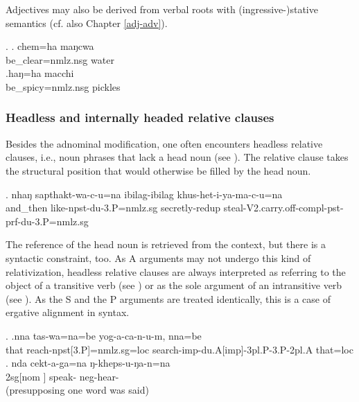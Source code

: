 Adjectives may also be derived from verbal roots with (ingressive-)stative semantics \Next (cf. also Chapter \ref{adj-adv}).


	  \ex. \ag.  chem=ha maŋcwa\\
	be\_clear{\sc =nmlz.nsg}  water		\\
	\bg.haŋ=ha macchi\\
	be\_spicy{\sc =nmlz.nsg}	pickles	\\

	
 

\subsubsection{Headless and internally headed relative clauses}\label{internally-headed-rc}
	
Besides the adnominal modification, one often encounters headless relative clauses, i.e.,  noun phrases that lack a head noun (see \Next). The relative clause takes the structural position that would otherwise be filled by the head noun.

\exg.  nhaŋ   sapthakt-wa-c-u=na                ibilag-ibilag       khus-het-i-ya-ma-c-u=na\\
 and\_then like{\sc -npst-du-3.P=nmlz.sg} secretly-{\sc redup} steal{\sc -V2.carry.off-compl-pst-prf-du-3.P=nmlz.sg}\\
 


The reference of the head noun is retrieved from the context, but there is a syntactic constraint, too.
As A arguments may not undergo this kind of relativization, headless relative clauses are always interpreted as referring to the object of a transitive verb (see \Next[a]) or as the sole argument of an intransitive verb (see \Next[b]). As the S and the P arguments are treated identically, this is a case of ergative alignment in syntax.

\ex. \ag.nna  tas-wa=na=be  yog-a-ca-n-u-m, nna=be\\
	that reach{\sc [3sg.A]-npst[3.P]=nmlz.sg=loc} search{\sc -imp-du.A[imp]-3pl.P-3.P-2pl.A}	that{\sc =loc}	\\
	\bg. nda  cekt-a-ga=na ŋ-kheps-u-ŋa-n=na\\
{\sc 2sg[nom ]} speak- {\sc neg}-hear-\\
  (presupposing one word was said)


